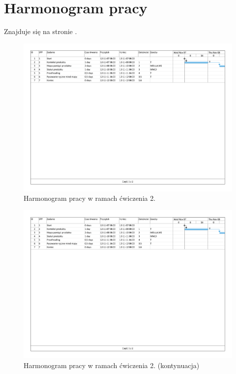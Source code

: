 \documentclass[10pt]{dokument-ppi}
\begin{document}
\Meta
{}
\MakeDokumentMeta


\section{Harmonogram pracy}

Znajduje się na stronie \pageref{fig:harmonogram}.

\begin{figure}[p]
    \includegraphics[page=1, trim=1cm 1cm 1cm 1cm, angle=270, width=\textwidth, clip=true]{./figury/harmonogram}
    \caption{Harmonogram pracy w ramach ćwiczenia 2.}
    \label{fig:harmonogram}
\end{figure}

\begin{figure}[p]
    \ContinuedFloat
    \includegraphics[page=2, trim=1cm 1cm 1cm 1cm, angle=270, width=\textwidth, clip=true]{./figury/harmonogram}
    \caption{Harmonogram pracy w ramach ćwiczenia 2. (kontynuacja)}
\end{figure}
\end{document}
